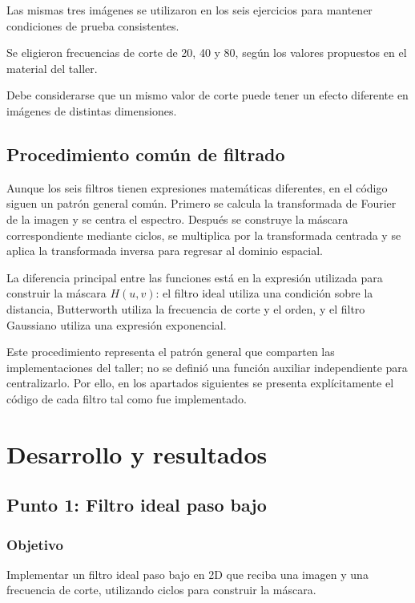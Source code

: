 \documentclass[11pt,letterpaper]{article}
\begin{document}
Las mismas tres imágenes se utilizaron
en los seis ejercicios para mantener
condiciones de prueba consistentes.

Se eligieron frecuencias de corte
de 20, 40 y 80, según los valores
propuestos en el material del taller.

Debe considerarse que un mismo valor
de corte puede tener un efecto diferente
en imágenes de distintas dimensiones.

\subsection{Procedimiento común de filtrado}

Aunque los seis filtros tienen expresiones
matemáticas diferentes, en el código siguen
un patrón general común. Primero se calcula
la transformada de Fourier de la imagen y
se centra el espectro. Después se construye
la máscara correspondiente mediante ciclos,
se multiplica por la transformada centrada
y se aplica la transformada inversa para
regresar al dominio espacial.

La diferencia principal entre las funciones
está en la expresión utilizada para construir
la máscara $H(u,v)$: el filtro ideal utiliza
una condición sobre la distancia, Butterworth
utiliza la frecuencia de corte y el orden,
y el filtro Gaussiano utiliza una expresión
exponencial.

Este procedimiento representa el patrón general
que comparten las implementaciones del taller;
no se definió una función auxiliar independiente
para centralizarlo. Por ello, en los apartados
siguientes se presenta explícitamente el código
de cada filtro tal como fue implementado.

\section{Desarrollo y resultados}

\subsection{Punto 1: Filtro ideal paso bajo}

\subsubsection*{Objetivo}

Implementar un filtro ideal paso bajo en 2D
que reciba una imagen y una frecuencia de corte,
utilizando ciclos para construir la máscara.
\end{document}
